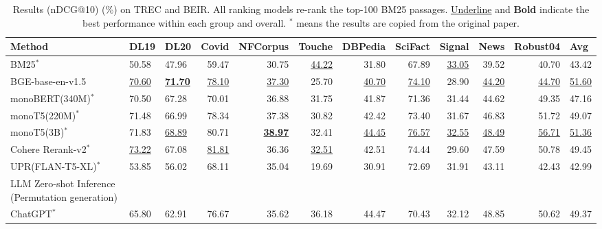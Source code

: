 \begin{table}[t]
  \centering
  \caption{Results (nDCG@10) (\%) on TREC and BEIR. All ranking models re-rank the top-100 BM25 passages. \underline{Underline} and \textbf{Bold} indicate the best performance within each group and overall. $^*$ means the results are copied from the original paper.}
  \small
   \setlength\tabcolsep{3.5pt}
    \begin{tabular}{ll|l|rrrrrrrrr}
    \toprule
    Method & \multicolumn{1}{l|}{DL19} & \multicolumn{1}{l}{DL20} & \multicolumn{1}{|l}{Covid} & \multicolumn{1}{l}{NFCorpus} & \multicolumn{1}{l}{Touche} & \multicolumn{1}{l}{DBPedia} & \multicolumn{1}{l}{SciFact} & \multicolumn{1}{l}{Signal} & \multicolumn{1}{l}{News} & \multicolumn{1}{l}{Robust04} & \multicolumn{1}{l}{Avg} \\
    \midrule
    BM25$^*$ \cite{robertson2009probabilistic}  & 50.58 & 47.96 & 59.47 & 30.75 & \underline{44.22} & 31.80  & 67.89 & \underline{33.05} & 39.52 & 40.70  & 43.42 \\
    BGE-base-en-v1.5 \cite{bge_embedding} &  \underline{70.60} &  \underline{\textbf{71.70}} & \underline{78.10} & \underline{37.30}  & 25.70  &  \underline{40.70}  &  \underline{74.10} &  28.90 & \underline{44.20}  &  \underline{44.70} & \underline{51.60}  \\
    \midrule
    monoBERT(340M)$^*$  \cite{nogueira2019passage} & 70.50  & 67.28 & 70.01 & 36.88 & 31.75 & 41.87 & 71.36 & 31.44 & 44.62 & 49.35 & 47.16 \\
    monoT5(220M)$^*$  \cite{nogueira2020document} & 71.48 & 66.99 & 78.34 & 37.38 & 30.82 & 42.42 & 73.40  & 31.67 & 46.83 & 51.72 & 49.07 \\
    monoT5(3B)$^*$  \cite{nogueira2020document} & 71.83 & \underline{68.89} & 80.71 & \underline{\textbf{38.97}} & 32.41 & \underline{44.45} & \underline{76.57} & \underline{32.55} & \underline{48.49} & \underline{56.71} & \underline{51.36} \\
    Cohere Rerank-v2$^*$    & \underline{73.22} & 67.08 & \underline{81.81} & 36.36 & \underline{32.51} & 42.51 & 74.44 & 29.60  & 47.59 & 50.78 & 49.45 \\
    UPR(FLAN-T5-XL)$^*$  \cite{sachan2022improving} & 53.85 & 56.02 & 68.11 & 35.04 & 19.69 & 30.91 & 72.69 & 31.91 & 43.11 & 42.43 & 42.99 \\
    \midrule
    LLM Zero-shot Inference (Permutation generation)   \\
    \midrule
    ChatGPT$^*$  \cite{sun2023chatgpt} & 65.80  & 62.91  & 76.67  & 35.62  & 36.18  & 44.47  & 70.43  & 32.12  & 48.85  & 50.62  & 49.37  \\

\end{tabular}
\end{table}
